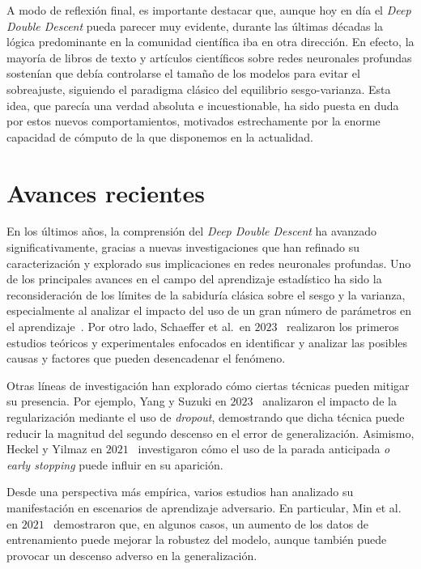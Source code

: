 A modo de reflexión final, es importante destacar que, aunque hoy en día el \textit{Deep Double Descent} pueda parecer muy evidente, durante las últimas décadas la lógica predominante en la comunidad científica iba en otra dirección. En efecto, la mayoría de libros de texto y artículos científicos sobre redes neuronales profundas sostenían que debía controlarse el tamaño de los modelos para evitar el sobreajuste, siguiendo el paradigma clásico del equilibrio sesgo-varianza. Esta idea, que parecía una verdad absoluta e incuestionable, ha sido puesta en duda por estos nuevos comportamientos, motivados estrechamente por la enorme capacidad de cómputo de la que disponemos en la actualidad.

\section{Avances recientes}\label{}

En los últimos años, la comprensión del \textit{Deep Double Descent} ha avanzado significativamente, gracias a nuevas investigaciones que han refinado su caracterización y explorado sus implicaciones en redes neuronales profundas. Uno de los principales avances en el campo del aprendizaje estadístico ha sido la reconsideración de los límites de la sabiduría clásica sobre el sesgo y la varianza, especialmente al analizar el impacto del uso de un gran número de parámetros en el aprendizaje~\cite{Zhang2021,Curth2023}. Por otro lado, Schaeffer et al.\ en $2023$~\cite{Schaeffer2023} realizaron los primeros estudios teóricos y experimentales enfocados en identificar y analizar las posibles causas y factores que pueden desencadenar el fenómeno.

Otras líneas de investigación han explorado cómo ciertas técnicas pueden mitigar su presencia. Por ejemplo, Yang y Suzuki en $2023$~\cite{Yang2024} analizaron el impacto de la regularización mediante el uso de \textit{dropout}, demostrando que dicha técnica puede reducir la magnitud del segundo descenso en el error de generalización. Asimismo, Heckel y Yilmaz en $2021$~\cite{Heckel2020} investigaron cómo el uso de la parada anticipada \emph{o early stopping} puede influir en su aparición.

Desde una perspectiva más empírica, varios estudios han analizado su manifestación en escenarios de aprendizaje adversario. En particular, Min et al. en $2021$~\cite{Ming2020} demostraron que, en algunos casos, un aumento de los datos de entrenamiento puede mejorar la robustez del modelo, aunque también puede provocar un descenso adverso en la generalización.

